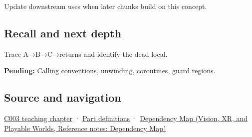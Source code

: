 \hypertarget{appendix-b081b7abe193-used-by}{}

Update downstream uses when later chunks build on this concept.

\subsection{Recall and next depth}\label{appendix-b081b7abe193-recall-and-next-depth}

\hypertarget{appendix-b081b7abe193-recall-and-next-depth}{}

Trace A→B→C→returns and identify the dead local.

\textbf{Pending:} Calling conventions, unwinding, coroutines, guard regions.

\subsection{Source and navigation}\label{appendix-b081b7abe193-source-and-navigation}

\hypertarget{appendix-b081b7abe193-source-and-navigation}{}

\hyperref[01-foundations-i-ch002-where-the-bytes-live]{C003 teaching chapter} · \hyperref[appendix-fd090d982a15-m003---parts-41-60]{Part definitions} · \href{../07-Vision-XR-and-Playable-Worlds/main.pdf\#nameddest=appendix-4ad47bdd269a}{Dependency Map (Vision, XR, and Playable Worlds, Reference notes: Dependency Map)}
